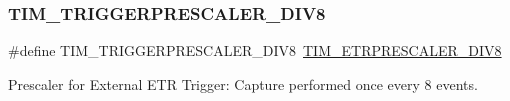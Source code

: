 \subsubsection{\texorpdfstring{TIM\_TRIGGERPRESCALER\_DIV8}{TIM\_TRIGGERPRESCALER\_DIV8}}
{\footnotesize\ttfamily \#define T\+I\+M\+\_\+\+T\+R\+I\+G\+G\+E\+R\+P\+R\+E\+S\+C\+A\+L\+E\+R\+\_\+\+D\+I\+V8~\mbox{\hyperlink{group___t_i_m___e_t_r___prescaler_ga834e38200874cced108379b17a24d0b7}{T\+I\+M\+\_\+\+E\+T\+R\+P\+R\+E\+S\+C\+A\+L\+E\+R\+\_\+\+D\+I\+V8}}}

Prescaler for External E\+TR Trigger\+: Capture performed once every 8 events. 
